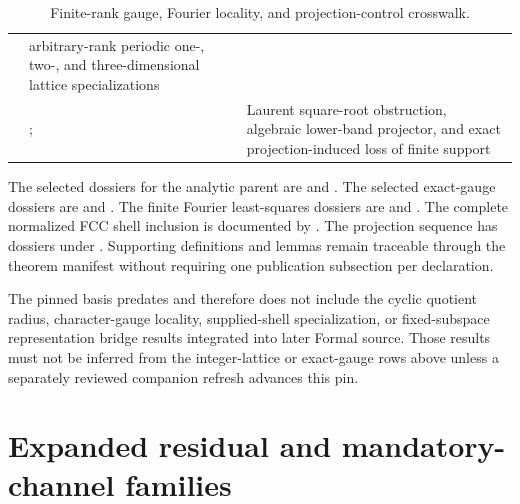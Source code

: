\begin{table}[ht]
\begin{tabularx}{\textwidth}{@{}Z Y Y@{}}
  & arbitrary-rank periodic one-, two-, and three-dimensional lattice specializations \\
  & ;
  & Laurent square-root obstruction, algebraic lower-band projector, and exact
    projection-induced loss of finite support \\
\bottomrule
\end{tabularx}
\caption{Finite-rank gauge, Fourier locality, and projection-control crosswalk.}
\label{tab:finite-rank-gauge-locality-crosswalk}
\end{table}
\FloatBarrier

The selected dossiers for the analytic parent are
and
.
The selected exact-gauge dossiers are
and
.
The finite Fourier least-squares dossiers are
and
.
The complete normalized FCC shell inclusion is documented by
.
The projection sequence has dossiers under .
Supporting definitions and lemmas remain traceable through the theorem manifest without requiring
one publication subsection per declaration.

The pinned basis predates and therefore does not include the cyclic quotient radius,
character-gauge locality, supplied-shell specialization, or fixed-subspace representation bridge
results integrated into later Formal source.  Those results must not be inferred from the
integer-lattice or exact-gauge rows above unless a separately reviewed companion refresh advances
this pin.

\section{Expanded residual and mandatory-channel families}

